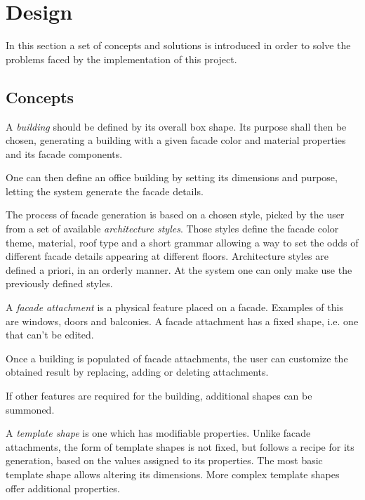 \chapter{Design}

In this section a set of concepts and solutions is introduced in order to solve the problems faced
by the implementation of this project.




\section{Concepts}

A \emph{building} should be defined by its overall box shape.
Its purpose shall then be chosen, generating a building
with a given facade color and material properties and
its facade components.

One can then define an office building by setting its dimensions
and purpose, letting the system generate the facade details.

The process of facade generation is based on a chosen style,
picked by the user from a set of available \emph{architecture styles}.
Those styles define the facade color theme, material, roof type and 
a short grammar allowing a way to set the odds of different facade details appearing
at different floors.
Architecture styles are defined a priori, in an orderly manner.
At the system one can only make use the previously defined styles.


A \emph{facade attachment} is a physical feature placed on a facade.
Examples of this are windows, doors and balconies.
A facade attachment has a fixed shape, i.e. one that can't be edited.

Once a building is populated of facade attachments,
the user can customize the obtained result
by replacing, adding or deleting attachments.

If other features are required for the building,
additional shapes can be summoned.

A \emph{template shape} is one which has modifiable properties.
Unlike facade attachments, the form of template shapes
is not fixed, but follows a recipe for its generation,
based on the values assigned to its properties.
The most basic template shape allows altering its dimensions.
More complex template shapes offer additional properties.

